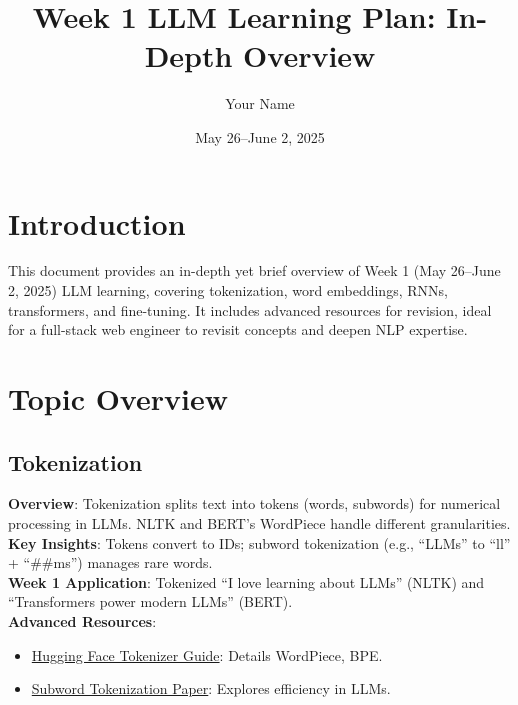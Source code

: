 \documentclass[a4paper,12pt]{article}
\title{Week 1 LLM Learning Plan: In-Depth Overview}
\author{Your Name}
\date{May 26--June 2, 2025}
\begin{document}
\maketitle

\section*{Introduction}
This document provides an in-depth yet brief overview of Week 1 (May 26--June 2, 2025) LLM learning, covering tokenization, word embeddings, RNNs, transformers, and fine-tuning. It includes advanced resources for revision, ideal for a full-stack web engineer to revisit concepts and deepen NLP expertise.

\section*{Topic Overview}

\subsection*{Tokenization}
\textbf{Overview}: Tokenization splits text into tokens (words, subwords) for numerical processing in LLMs. NLTK and BERT’s WordPiece handle different granularities. \\
\textbf{Key Insights}: Tokens convert to IDs; subword tokenization (e.g., ``LLMs'' to ``ll'' + ``##ms'') manages rare words. \\
\textbf{Week 1 Application}: Tokenized ``I love learning about LLMs'' (NLTK) and ``Transformers power modern LLMs'' (BERT). \\
\textbf{Advanced Resources}:
\begin{itemize}
    \item \href{https://huggingface.co/docs/transformers/tokenizer_summary}{Hugging Face Tokenizer Guide}: Details WordPiece, BPE.
    \item \href{https://arxiv.org/abs/1907.11692}{Subword Tokenization Paper}: Explores efficiency in LLMs.
\end{itemize}

\end{document}
